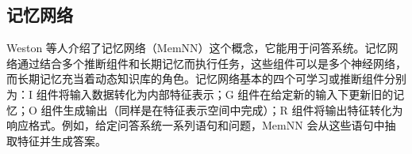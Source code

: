 \documentclass[lang=cn,11pt,a4paper]{elegantpaper}
\begin{document}







\subsection{记忆网络}
Weston 等人介绍了记忆网络（MemNN）这个概念，它能用于问答系统\cite{10}。记忆网络通过结合多个推断组件和长期记忆而执行任务，这些组件可以是多个神经网络，而长期记忆充当着动态知识库的角色。记忆网络基本的四个可学习或推断组件分别为：I 组件将输入数据转化为内部特征表示；G 组件在给定新的输入下更新旧的记忆；O 组件生成输出（同样是在特征表示空间中完成）；R 组件将输出特征转化为响应格式。例如，给定问答系统一系列语句和问题，MemNN 会从这些语句中抽取特征并生成答案。
\end{document}
